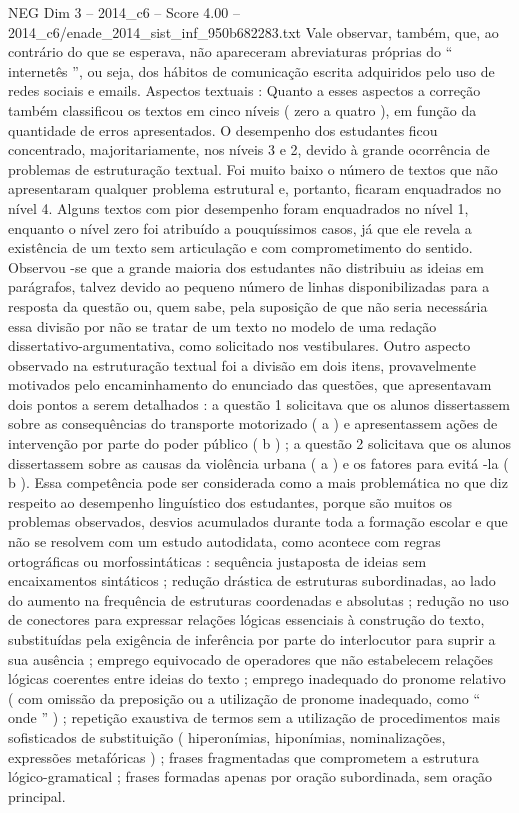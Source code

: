 \begin{textsample}{NEG Dim 3 – 2014\_c6 – Score 4.00 – 2014\_c6/enade\_2014\_sist\_inf\_950b682283.txt}
Vale observar, também, que, ao contrário do que se esperava, não apareceram abreviaturas próprias do “ internetês ”, ou seja, dos hábitos de comunicação escrita adquiridos pelo uso de redes sociais e emails.
Aspectos textuais : Quanto a esses aspectos a correção também classificou os textos em cinco níveis ( zero a quatro ), em função da quantidade de erros apresentados.
O desempenho dos estudantes ficou concentrado, majoritariamente, nos níveis 3 e 2, devido à grande ocorrência de problemas de estruturação textual.
Foi muito baixo o número de textos que não apresentaram qualquer problema estrutural e, portanto, ficaram enquadrados no nível 4.
Alguns textos com pior desempenho foram enquadrados no nível 1, enquanto o nível zero foi atribuído a pouquíssimos casos, já que ele revela a existência de um texto sem articulação e com comprometimento do sentido.
Observou -se que a grande maioria dos estudantes não distribuiu as ideias em parágrafos, talvez devido ao pequeno número de linhas disponibilizadas para a resposta da questão ou, quem sabe, pela suposição de que não seria necessária essa divisão por não se tratar de um texto no modelo de uma redação dissertativo-argumentativa, como solicitado nos vestibulares.
Outro aspecto observado na estruturação textual foi a divisão em dois itens, provavelmente motivados pelo encaminhamento do enunciado das questões, que apresentavam dois pontos a serem detalhados : a questão 1 solicitava que os alunos dissertassem sobre as consequências do transporte motorizado ( a ) e apresentassem ações de intervenção por parte do poder público ( b ) ; a questão 2 solicitava que os alunos dissertassem sobre as causas da violência urbana ( a ) e os fatores para evitá -la ( b ).
Essa competência pode ser considerada como a mais problemática no que diz respeito ao desempenho linguístico dos estudantes, porque são muitos os problemas observados, desvios acumulados durante toda a formação escolar e que não se resolvem com um estudo autodidata, como acontece com regras ortográficas ou morfossintáticas : sequência justaposta de ideias sem encaixamentos sintáticos ; redução drástica de estruturas subordinadas, ao lado do aumento na frequência de estruturas coordenadas e absolutas ; redução no uso de conectores para expressar relações lógicas essenciais à construção do texto, substituídas pela exigência de inferência por parte do interlocutor para suprir a sua ausência ; emprego equivocado de operadores que não estabelecem relações lógicas coerentes entre ideias do texto ; emprego inadequado do pronome relativo ( com omissão da preposição ou a utilização de pronome inadequado, como “ onde ” ) ; repetição exaustiva de termos sem a utilização de procedimentos mais sofisticados de substituição ( hiperonímias, hiponímias, nominalizações, expressões metafóricas ) ; frases fragmentadas que comprometem a estrutura lógico-gramatical ; frases formadas apenas por oração subordinada, sem oração principal.

\end{textsample}
